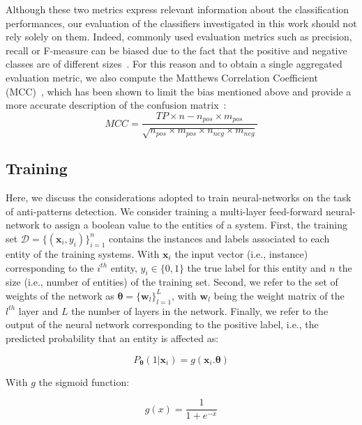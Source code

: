 Although these two metrics express relevant information about the classification performances, our evaluation of the classifiers investigated in this work should not rely solely on them. Indeed, commonly used evaluation metrics such as precision, recall or F-measure can be biased due to the fact that the positive and negative classes are of different sizes~\cite{powers2011evaluation}. For this reason and to obtain a single aggregated evaluation metric, we also compute the Matthews Correlation Coefficient (MCC)~\cite{matthews1975comparison}, which has been shown to limit the bias mentioned above and provide a more accurate description of the confusion matrix~\cite{powers2011evaluation}:   
\begin{equation}
\label{mcc}
MCC = \frac{TP \times n - n_{pos} \times m_{pos}}{\sqrt{n_{pos} \times m_{pos} \times n_{neg} \times m_{neg}}}
\end{equation}

\subsection{Training}
\label{subsection: training}
Here, we discuss the considerations adopted to train neural-networks on the task of anti-patterns detection. We consider training a multi-layer feed-forward neural-network to assign a boolean value to the entities of a system. First, the training set $\mathcal{D} = \{(\textbf{x}_{i}, y_{i})\}_{i=1}^{n}$ contains the instances and labels associated to each entity of the training systems. With $\textbf{x}_{i}$ the input vector (i.e., instance) corresponding to the $i^{th}$ entity, $y_{i} \in \{0, 1\}$ the true label for this entity and $n$ the size (i.e., number of entities) of the training set. Second, we refer to the set of weights of the network as $\bm{\theta} = \{\textbf{w}_{l}\}_{l=1}^{L}$, with $\textbf{w}_{l}$ being the weight matrix of the $l^{th}$ layer and $L$ the number of layers in the network. Finally, we refer to the output of the neural network corresponding to the positive label, i.e., the predicted probability that an entity is affected as:

\begin{equation}
   P_{\bm{\theta}}(1|\textbf{x}_{i}) = g(\textbf{x}_{i}.\bm{\theta}) 
\end{equation}

With $g$ the sigmoid function:

\begin{equation}
    g(x) = \frac{1}{1 + e^{-x}}
\end{equation}

